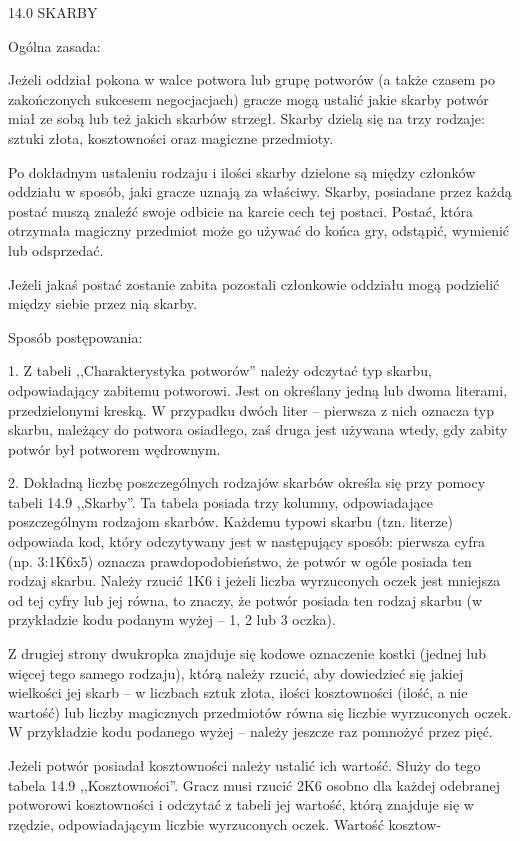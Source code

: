 14.0 SKARBY

Ogólna zasada:

Jeżeli oddział pokona w walce potwora lub grupę potworów (a także czasem po zakończonych sukcesem negocjacjach) gracze mogą ustalić jakie skarby potwór miał ze sobą lub też jakich skarbów strzegł.
Skarby dzielą się na trzy rodzaje: sztuki złota, kosztowności oraz magiczne przedmioty.

Po dokładnym ustaleniu rodzaju i ilości skarby dzielone są między członków oddziału w sposób, jaki gracze uznają za właściwy.
Skarby, posiadane przez każdą postać muszą znaleźć swoje odbicie na karcie cech tej postaci.
Postać, która otrzymała magiczny przedmiot może go używać do końca gry, odstąpić, wymienić lub odsprzedać.

Jeżeli jakaś postać zostanie zabita pozostali członkowie oddziału mogą podzielić między siebie przez nią skarby.

Sposób postępowania:

1.
Z tabeli ,,Charakterystyka potworów'' należy odczytać typ skarbu, odpowiadający zabitemu potworowi.
Jest on określany jedną lub dwoma literami, przedzielonymi kreską.
W przypadku dwóch liter – pierwsza z nich oznacza typ skarbu, należący do potwora osiadłego, zaś druga jest używana wtedy, gdy zabity potwór był potworem wędrownym.

2.
Dokładną liczbę poszczególnych rodzajów skarbów określa się przy pomocy tabeli 14.9 ,,Skarby''.
Ta tabela posiada trzy kolumny, odpowiadające poszczególnym rodzajom skarbów.
Każdemu typowi skarbu (tzn. literze) odpowiada kod, który odczytywany jest w następujący sposób: pierwsza cyfra (np. 3:1K6x5) oznacza prawdopodobieństwo, że potwór w ogóle posiada ten rodzaj skarbu.
Należy rzucić 1K6 i jeżeli liczba wyrzuconych oczek jest mniejsza od tej cyfry lub jej równa, to znaczy, że potwór posiada ten rodzaj skarbu (w przykładzie kodu podanym wyżej – 1, 2 lub 3 oczka).

Z drugiej strony dwukropka znajduje się kodowe oznaczenie kostki (jednej lub więcej tego samego rodzaju), którą należy rzucić, aby dowiedzieć się jakiej wielkości jej skarb – w liczbach sztuk złota, ilości kosztowności (ilość, a nie wartość) lub liczby magicznych przedmiotów równa się liczbie wyrzuconych oczek.
W przykładzie kodu podanego wyżej – należy jeszcze raz pomnożyć przez pięć.

Jeżeli potwór posiadał kosztowności należy ustalić ich wartość.
Służy do tego tabela 14.9 ,,Kosztowności''.
Gracz musi rzucić 2K6 osobno dla każdej odebranej potworowi kosztowności i odczytać z tabeli jej wartość, którą znajduje się w rzędzie, odpowiadającym liczbie wyrzuconych oczek.
Wartość kosztow-

